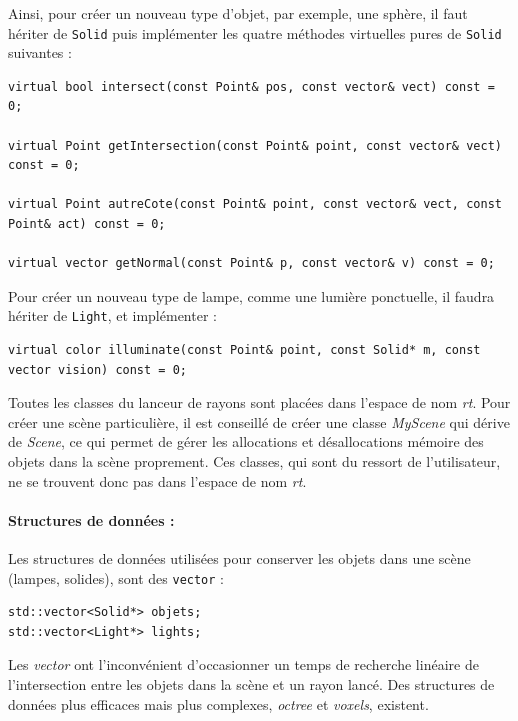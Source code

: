 Ainsi, pour créer un nouveau type d'objet, par exemple, une sphère, il faut hériter de \verb|Solid| puis implémenter les quatre méthodes virtuelles 
pures de \verb|Solid| suivantes :

\begin{lstlisting}
virtual bool intersect(const Point& pos, const vector& vect) const = 0;

virtual Point getIntersection(const Point& point, const vector& vect) const = 0;

virtual Point autreCote(const Point& point, const vector& vect,	const Point& act) const = 0;

virtual vector getNormal(const Point& p, const vector& v) const = 0;
\end{lstlisting}

Pour créer un nouveau type de lampe, comme une lumière ponctuelle, il faudra hériter de \verb|Light|, et implémenter :
\begin{lstlisting}
virtual color illuminate(const Point& point, const Solid* m, const vector vision) const = 0;
\end{lstlisting}

Toutes les classes du lanceur de rayons sont placées dans l'espace de nom \emph{rt}. Pour créer une scène particulière, il est
conseillé de créer une classe \emph{MyScene} qui dérive de \emph{Scene}, ce qui permet de gérer les allocations et désallocations 
mémoire des objets dans la scène proprement. Ces classes, qui sont du ressort de l'utilisateur, ne se trouvent donc pas dans l'espace
 de nom \emph{rt}.

\paragraph{Structures de données : }
Les structures de données utilisées pour conserver les objets dans une scène (lampes, solides), sont des \verb|vector| : 
\begin{lstlisting}
std::vector<Solid*> objets;
std::vector<Light*> lights;
\end{lstlisting}
Les \emph{vector} ont l'inconvénient d'occasionner un temps de recherche linéaire de l'intersection entre les objets dans la scène et un rayon lancé. 
Des structures de données plus efficaces mais plus complexes, \emph{octree} et \emph{voxels}, existent.